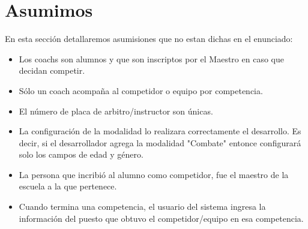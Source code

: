 \section{Asumimos}

En esta secci\'on detallaremos asumisiones que no estan dichas en el enunciado:

\begin{itemize}

\item Los coachs son alumnos y que son inscriptos por el Maestro en caso que decidan competir.
\item S\'olo un coach acompaña al competidor o equipo por competencia.
\item El n\'umero de placa de arbitro/instructor son \'unicas.
\item La configuraci\'on de la modalidad lo realizara correctamente el desarrollo. Es decir, si el desarrollador agrega la modalidad "Combate" entonce configurar\'a solo los campos de edad y g\'enero. 
\item La persona que incribió al alumno como competidor, fue el maestro de la escuela a la que pertenece.
\item Cuando termina una competencia, el usuario del sistema ingresa la información del puesto que obtuvo el competidor/equipo en esa competencia.
\end{itemize}


